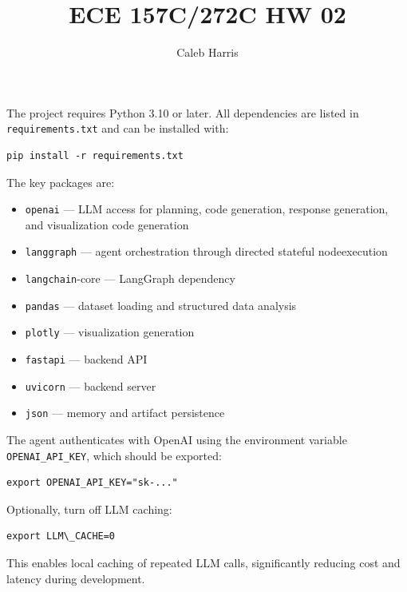\documentclass[12pt, oneside]{report}
\title{ECE 157C/272C HW 02}
\author{Caleb Harris}
\date{}
\begin{document}






The project requires Python 3.10 or later. All dependencies are listed in \texttt{requirements.txt} and can be installed with:

\begin{verbatim}
pip install -r requirements.txt
\end{verbatim}

The key packages are:

\begin{itemize}
    \item \texttt{openai} --- LLM access for planning, code generation, response generation, and visualization code generation
    \item \texttt{langgraph} --- agent orchestration through directed stateful nodeexecution
    \item \texttt{langchain}-core --- LangGraph dependency
    \item \texttt{pandas} --- dataset loading and structured data analysis
    \item \texttt{plotly} --- visualization generation
    \item \texttt{fastapi} --- backend API
    \item \texttt{uvicorn} --- backend server
    \item \texttt{json} --- memory and artifact persistence
\end{itemize}


The agent authenticates with OpenAI using the environment variable \texttt{OPENAI\_API\_KEY}, which should be exported:

\begin{verbatim}
export OPENAI_API_KEY="sk-..."
\end{verbatim}

Optionally, turn off LLM caching:

\begin{verbatim}
export LLM\_CACHE=0
\end{verbatim}

This enables local caching of repeated LLM calls, significantly reducing cost and latency during development.

\end{document}
